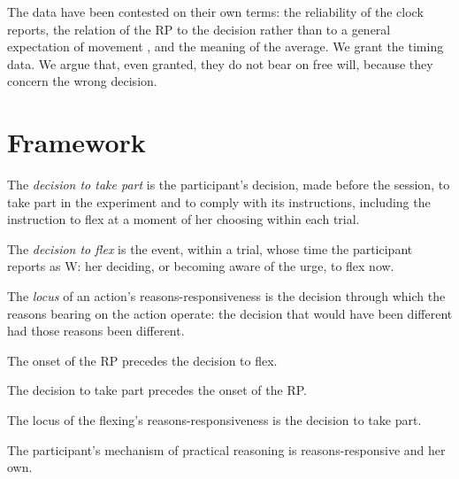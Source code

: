 \documentclass{situationist-preprint}
\begin{document}
The data have been contested on their own terms: the reliability of the clock reports, the relation of the RP to the decision rather than to a general expectation of movement \citep{TrevenaMiller2010}, and the meaning of the average. We grant the timing data. We argue that, even granted, they do not bear on free will, because they concern the wrong decision.

\section{Framework}

\begin{definition}\label{d:part}
The \emph{decision to take part} is the participant's decision, made before the session, to take part in the experiment and to comply with its instructions, including the instruction to flex at a moment of her choosing within each trial.
\end{definition}

\begin{definition}\label{d:flex}
The \emph{decision to flex} is the event, within a trial, whose time the participant reports as W: her deciding, or becoming aware of the urge, to flex now.
\end{definition}

\begin{definition}[Locus]\label{d:locus}
The \emph{locus} of an action's reasons-responsiveness is the decision through which the reasons bearing on the action operate: the decision that would have been different had those reasons been different.
\end{definition}

\begin{assumption}\label{a:data}
The onset of the RP precedes the decision to flex.
\end{assumption}

\begin{assumption}[Protocol]\label{a:protocol}
The decision to take part precedes the onset of the RP.
\end{assumption}

\begin{assumption}[Locus]\label{a:locus}
The locus of the flexing's reasons-responsiveness is the decision to take part.
\end{assumption}

\begin{assumption}\label{a:ordinary}
The participant's mechanism of practical reasoning is reasons-responsive and her own.
\end{assumption}
\end{document}
